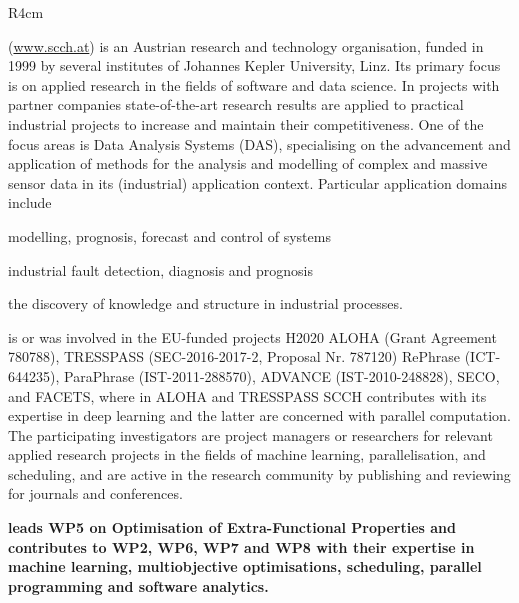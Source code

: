 \documentclass[a4paper,11pt]{article}
\begin{document}

\begin{wrapfigure}{R}{4cm}
\vspace{-2cm}
\hfill {}
\vspace{-1cm}
\end{wrapfigure}

\SCCH{} (\url{www.scch.at}) is an Austrian research and technology organisation, funded in 1999 by several institutes of Johannes Kepler University, Linz. Its primary focus is on applied research in the fields of software and data science. 
In projects with partner companies state-of-the-art research results are applied to practical industrial projects to increase and maintain their competitiveness. One of the focus areas is Data Analysis Systems (DAS), specialising on the advancement and application of methods for the analysis and modelling of complex and massive sensor data in its (industrial) application context. Particular application domains include
\begin{inparaenum}[a)]
\item modelling, prognosis, forecast and control of systems
\item industrial fault detection, diagnosis and prognosis
\item the discovery of knowledge and structure in industrial processes.
\end{inparaenum}
\SCCHshort{} is or was involved in the EU-funded projects H2020 ALOHA (Grant Agreement 780788), TRESSPASS (SEC-2016-2017-2, Proposal Nr. 787120) RePhrase (ICT-644235), ParaPhrase (IST-2011-288570), ADVANCE (IST-2010-248828), SECO, and FACETS, where in ALOHA and TRESSPASS SCCH contributes with its expertise in deep learning and the latter are concerned with parallel computation.  The participating investigators are project managers or researchers for relevant applied research projects in the fields of machine learning, parallelisation, and scheduling, and are active in the research community by publishing and reviewing for journals and conferences.

\vspace{10pt}
\textbf{\SCCHshort{} leads WP5 on Optimisation of Extra-Functional Properties and contributes to WP2, WP6, WP7 and WP8 with their expertise in machine learning, multiobjective optimisations, scheduling, parallel programming and software analytics.}
\vspace{10pt}
\end{document}
